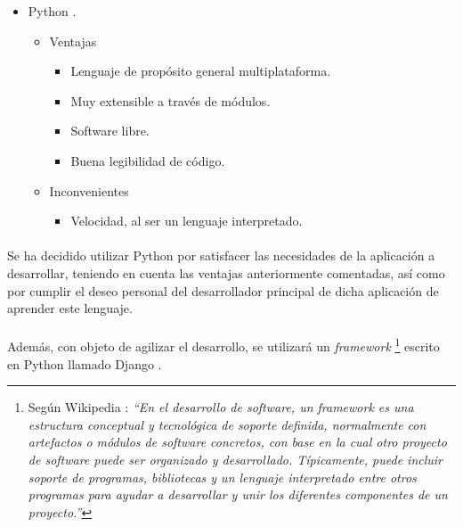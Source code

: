 \begin{itemize}
\begin{itemize}
\begin{itemize}
            \end{itemize}
      \end{itemize}
    \item Python \cite{python}.
      \begin{itemize}
         \item Ventajas
            \begin{itemize}
             \item Lenguaje de propósito general multiplataforma.
             \item Muy extensible a través de módulos.
             \item Software libre.
             \item Buena legibilidad de código.
            \end{itemize}
         \item Inconvenientes
            \begin{itemize}
             \item Velocidad, al ser un lenguaje interpretado.
            \end{itemize}
      \end{itemize}
   \end{itemize}

   \paragraph{}Se ha decidido utilizar Python por satisfacer las necesidades
   de la aplicación a desarrollar, teniendo en cuenta las ventajas anteriormente
   comentadas, así como por cumplir el deseo personal del desarrollador
   principal de dicha aplicación de aprender este lenguaje.

   \paragraph{}Además, con objeto de agilizar el desarrollo, se utilizará
   un \textit{framework} \footnote{Según Wikipedia \cite{wikipedia2}:
   \textit{``En el desarrollo de software, un framework es una estructura
   conceptual y tecnológica de soporte definida, normalmente con artefactos o
   módulos de software concretos, con base en la cual otro proyecto de software
   puede ser organizado y desarrollado. Típicamente, puede incluir soporte de
   programas, bibliotecas y un lenguaje interpretado entre otros programas para
   ayudar a desarrollar y unir los diferentes componentes de un proyecto.''}}
   escrito en Python llamado Django \cite{django}.

